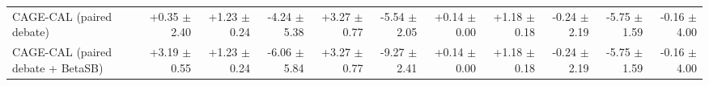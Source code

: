\begin{tabular}{lrrrrrrrrrr}
CAGE-CAL (paired debate) & +0.35 {\scriptsize $\pm$ 2.40} & +1.23 {\scriptsize $\pm$ 0.24} & -4.24 {\scriptsize $\pm$ 5.38} & +3.27 {\scriptsize $\pm$ 0.77} & -5.54 {\scriptsize $\pm$ 2.05} & +0.14 {\scriptsize $\pm$ 0.00} & +1.18 {\scriptsize $\pm$ 0.18} & -0.24 {\scriptsize $\pm$ 2.19} & -5.75 {\scriptsize $\pm$ 1.59} & -0.16 {\scriptsize $\pm$ 4.00} \\
CAGE-CAL (paired debate + BetaSB) & +3.19 {\scriptsize $\pm$ 0.55} & +1.23 {\scriptsize $\pm$ 0.24} & -6.06 {\scriptsize $\pm$ 5.84} & +3.27 {\scriptsize $\pm$ 0.77} & -9.27 {\scriptsize $\pm$ 2.41} & +0.14 {\scriptsize $\pm$ 0.00} & +1.18 {\scriptsize $\pm$ 0.18} & -0.24 {\scriptsize $\pm$ 2.19} & -5.75 {\scriptsize $\pm$ 1.59} & -0.16 {\scriptsize $\pm$ 4.00} \\
\bottomrule
\end{tabular}
